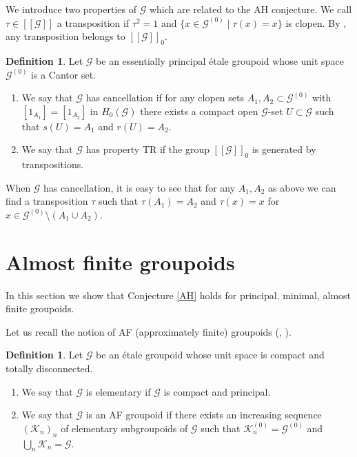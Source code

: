 \documentclass[11pt]{article}
\theoremstyle{definition}
\newtheorem{definition}[theorem]{Definition}
\numberwithin{equation}{section}
\newcommand{\K}{\mathcal{K}}
\newcommand{\G}{\mathcal{G}}
\begin{document}
We introduce two properties of $\G$ 
which are related to the AH conjecture. 
We call $\tau\in[[\G]]$ a transposition 
if $\tau^2=1$ and $\{x\in\G^{(0)}\mid\tau(x)=x\}$ is clopen. 
By \cite[Lemma 7.7 (3)]{M12PLMS}, 
any transposition belongs to $[[\G]]_0$. 

\begin{definition}
Let $\G$ be an essentially principal \'etale groupoid 
whose unit space $\G^{(0)}$ is a Cantor set. 
\begin{enumerate}
\item We say that $\G$ has cancellation 
if for any clopen sets $A_1,A_2\subset\G^{(0)}$ 
with $[1_{A_1}]=[1_{A_2}]$ in $H_0(\G)$ 
there exists a compact open $\G$-set $U\subset\G$ 
such that $s(U)=A_1$ and $r(U)=A_2$. 
\item We say that $\G$ has property TR 
if the group $[[\G]]_0$ is generated by transpositions. 
\end{enumerate}
\end{definition}

When $\G$ has cancellation, 
it is easy to see that for any $A_1,A_2$ as above 
we can find a transposition $\tau$ such that $\tau(A_1)=A_2$ 
and $\tau(x)=x$ for $x\in\G^{(0)}\setminus(A_1\cup A_2)$. 




\section{Almost finite groupoids}

In this section we show that Conjecture \ref{AH} holds 
for principal, minimal, almost finite groupoids. 

Let us recall the notion of AF (approximately finite) groupoids 
(\cite[Definition III.1.1]{Rtext}, \cite[Definition 3.7]{GPS04ETDS}). 

\begin{definition}
Let $\G$ be an \'etale groupoid 
whose unit space is compact and totally disconnected. 
\begin{enumerate}
\item We say that $\G$ is elementary if $\G$ is compact and principal. 
\item We say that $\G$ is an AF groupoid 
if there exists an increasing sequence $(\K_n)_n$ of 
elementary subgroupoids of $\G$ 
such that $\K_n^{(0)}=\G^{(0)}$ and $\bigcup_n\K_n=\G$. 
\end{enumerate}
\end{definition}
\end{document}
